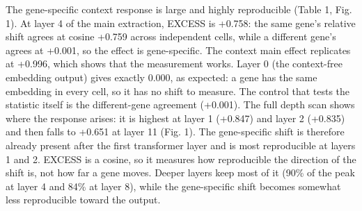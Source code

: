 \documentclass[
  11pt,
]{article}
\begin{document}
The gene-specific context response is large and highly reproducible
(Table 1, Fig. 1). At layer 4 of the main extraction, EXCESS is +0.758:
the same gene's relative shift agrees at cosine +0.759 across
independent cells, while a different gene's agrees at +0.001, so the
effect is gene-specific. The context main effect replicates at +0.996,
which shows that the measurement works. Layer 0 (the context-free
embedding output) gives exactly 0.000, as expected: a gene has the same
embedding in every cell, so it has no shift to measure. The control that
tests the statistic itself is the different-gene agreement (+0.001). The
full depth scan shows where the response arises: it is highest at layer
1 (+0.847) and layer 2 (+0.835) and then falls to +0.651 at layer 11
(Fig. 1). The gene-specific shift is therefore already present after the
first transformer layer and is most reproducible at layers 1 and 2.
EXCESS is a cosine, so it measures how reproducible the direction of the
shift is, not how far a gene moves. Deeper layers keep most of it (90\%
of the peak at layer 4 and 84\% at layer 8), while the gene-specific
shift becomes somewhat less reproducible toward the output.
\end{document}
